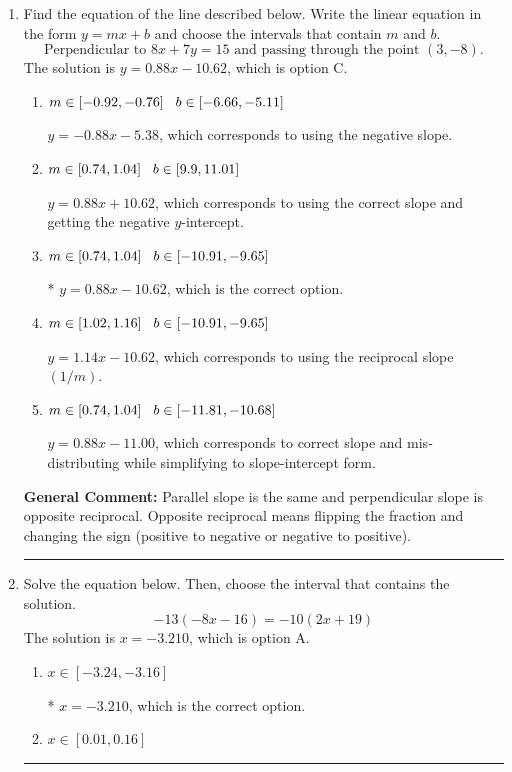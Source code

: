 \documentclass{extbook}[14pt]
\newcommand{\litem}[1]{\item #1

\rule{\textwidth}{0.4pt}}
\begin{document}
\begin{enumerate}\litem{
Find the equation of the line described below. Write the linear equation in the form $ y=mx+b $ and choose the intervals that contain $m$ and $b$.
\[ \text{Perpendicular to } 8 x + 7 y = 15 \text{ and passing through the point } (3, -8). \]The solution is \( y = 0.88x - 10.62 \), which is option C.\begin{enumerate}[label=\Alph*.]
\item \( m \in [-0.92, -0.76] \hspace*{3mm} b \in [-6.66, -5.11] \)

 $y = -0.88x - 5.38$, which corresponds to using the negative slope.
\item \( m \in [0.74, 1.04] \hspace*{3mm} b \in [9.9, 11.01] \)

 $y = 0.88x + 10.62$, which corresponds to using the correct slope and getting the negative $y$-intercept.
\item \( m \in [0.74, 1.04] \hspace*{3mm} b \in [-10.91, -9.65] \)

* $y = 0.88x - 10.62$, which is the correct option.
\item \( m \in [1.02, 1.16] \hspace*{3mm} b \in [-10.91, -9.65] \)

 $y = 1.14x - 10.62$, which corresponds to using the reciprocal slope $(1/m)$.
\item \( m \in [0.74, 1.04] \hspace*{3mm} b \in [-11.81, -10.68] \)

 $y = 0.88x - 11.00$, which corresponds to correct slope and mis-distributing while simplifying to slope-intercept form.
\end{enumerate}

\textbf{General Comment:} Parallel slope is the same and perpendicular slope is opposite reciprocal. Opposite reciprocal means flipping the fraction and changing the sign (positive to negative or negative to positive).
}
\litem{
Solve the equation below. Then, choose the interval that contains the solution.
\[ -13(-8x -16) = -10(2x + 19) \]The solution is \( x = -3.210 \), which is option A.\begin{enumerate}[label=\Alph*.]
\item \( x \in [-3.24, -3.16] \)

* $x = -3.210$, which is the correct option.
\item \( x \in [0.01, 0.16] \)


\end{enumerate}}
\end{enumerate}
\end{document}
